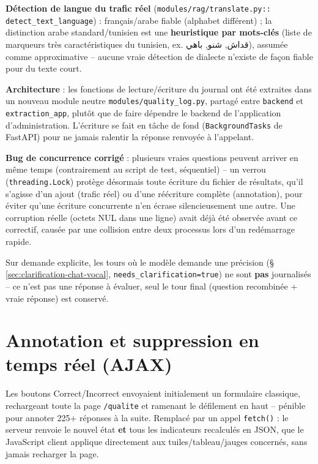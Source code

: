 \documentclass[11pt,a4paper]{report}
\begin{document}
\textbf{Détection de langue du trafic réel} (\texttt{modules/rag/translate.py::
detect\_text\_language}) : français/arabe fiable (alphabet différent) ; la distinction
arabe standard/tunisien est une \textbf{heuristique par mots-clés} (liste de marqueurs
très caractéristiques du tunisien, ex. قداش, شنو, باهي), assumée comme approximative --
aucune vraie détection de dialecte n'existe de façon fiable pour du texte court.

\textbf{Architecture} : les fonctions de lecture/écriture du journal ont été extraites
dans un nouveau module neutre \texttt{modules/quality\_log.py}, partagé entre
\texttt{backend} et \texttt{extraction\_app}, plutôt que de faire dépendre le backend de
l'application d'administration. L'écriture se fait en tâche de fond
(\texttt{BackgroundTasks} de FastAPI) pour ne jamais ralentir la réponse renvoyée à
l'appelant.

\begin{statutlimite}
\textbf{Bug de concurrence corrigé} : plusieurs vraies questions peuvent arriver en même
temps (contrairement au script de test, séquentiel) -- un verrou (\texttt{threading.Lock})
protège désormais toute écriture du fichier de résultats, qu'il s'agisse d'un ajout
(trafic réel) ou d'une réécriture complète (annotation), pour éviter qu'une écriture
concurrente n'en écrase silencieusement une autre. Une corruption réelle (octets NUL dans
une ligne) avait déjà été observée avant ce correctif, causée par une collision entre
deux processus lors d'un redémarrage rapide.
\end{statutlimite}

Sur demande explicite, les tours où le modèle demande une précision
(\S\,\ref{sec:clarification-chat-vocal}, \texttt{needs\_clarification=true}) ne sont
\textbf{pas} journalisés -- ce n'est pas une réponse à évaluer, seul le tour final
(question recombinée + vraie réponse) est conservé.

\section{Annotation et suppression en temps réel (AJAX)}
Les boutons Correct/Incorrect envoyaient initialement un formulaire classique,
rechargeant toute la page \texttt{/qualite} et ramenant le défilement en haut -- pénible
pour annoter 225+ réponses à la suite. Remplacé par un appel \texttt{fetch()} : le serveur
renvoie le nouvel état \textbf{et} tous les indicateurs recalculés en JSON, que le
JavaScript client applique directement aux tuiles/tableau/jauges concernés, sans jamais
recharger la page.
\end{document}
